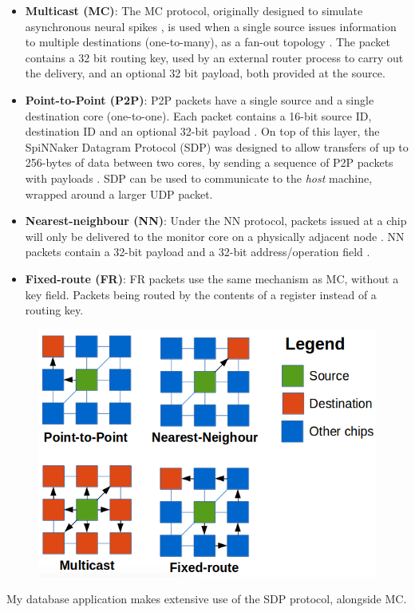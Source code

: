 \begin{itemize}
\item \textbf{Multicast (MC)}: The MC protocol, originally designed to simulate asynchronous neural spikes \cite{multicastpaper}, is used when a single source issues information to multiple destinations (one-to-many), as a fan-out topology \cite{overviewspinn}. The packet contains a 32 bit routing key, used by an external router process to carry out the delivery, and an optional 32 bit payload, both provided at the source.

\item \textbf{Point-to-Point (P2P)}: P2P packets have a single source and a single destination core (one-to-one). Each packet contains a 16-bit source ID, destination ID and an optional 32-bit payload \cite{datasheet}.
On top of this layer, the SpiNNaker Datagram Protocol (SDP) was designed to allow transfers of up to 256-bytes of data between two cores, by sending a sequence of P2P packets with payloads \cite{sdp}. SDP can be used to communicate to the \textit{host} machine, wrapped around a larger UDP packet.

\item \textbf{Nearest-neighbour (NN)}: Under the NN protocol, packets issued at a chip will only be delivered to the monitor core on a physically adjacent node \cite{overviewspinn}. NN packets contain a 32-bit payload and a 32-bit address/operation field \cite{datasheet}.

\item \textbf{Fixed-route (FR)}: FR packets use the same mechanism as MC, without a key field. Packets being routed by the contents of a register instead of a routing key. 
\end{itemize}

\begin{figure}
  \centering
  \includegraphics[width=1\linewidth, natwidth=621, natheight=454]{images/packet_types.png}
  \label{fig:comm_protocols}
\end{figure}

My database application makes extensive use of the SDP protocol, alongside MC.